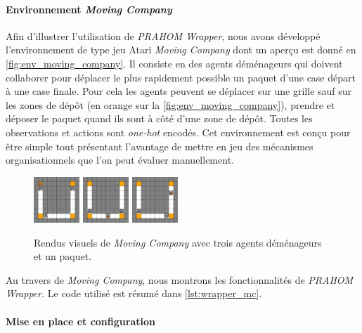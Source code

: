 \documentclass[demonstration]{jfsma}
\begin{document}
\paragraph{Environnement \emph{Moving Company}}

Afin d'illustrer l'utilisation de \emph{PRAHOM Wrapper}, nous avons développé l'environnement de type jeu Atari \emph{Moving Company} dont un aperçu est donné en \autoref{fig:env_moving_company}. Il consiste en des agents déménageurs qui doivent collaborer pour déplacer le plus rapidement possible un paquet d'une case départ à une case finale. Pour cela les agents peuvent se déplacer sur une grille sauf sur les zones de dépôt (en orange sur la \autoref{fig:env_moving_company}), prendre et déposer le paquet quand ils sont à côté d'une zone de dépôt. Toutes les observations et actions sont \emph{one-hot} encodés. Cet environnement est conçu pour être simple tout présentant l'avantage de mettre en jeu des mécanismes organisationnels que l'on peut évaluer manuellement.

\begin{figure}[h!]
  \centering
  \includegraphics[width=0.154\textwidth]{figures/moving_company_1.png}
  \includegraphics[width=0.154\textwidth]{figures/moving_company_2.png}
  \includegraphics[width=0.154\textwidth]{figures/moving_company_3.png}
  \caption{Rendus visuels de \emph{Moving Company} avec trois agents déménageurs et un paquet.}
  \label{fig:env_moving_company}
\end{figure}

Au travers de \emph{Moving Company}, nous montrons les fonctionnalités de \emph{PRAHOM Wrapper}. Le code utilisé est résumé dans \autoref{lst:wrapper_mc}.

\paragraph{Mise en place et configuration}
\end{document}
